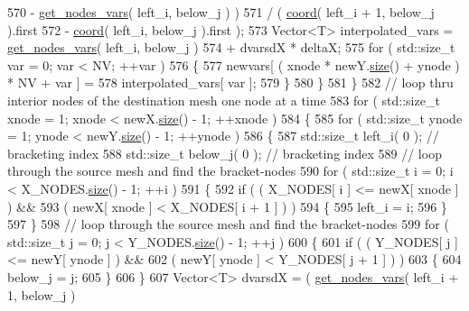 \begin{DoxyCode}
570                               - \hyperlink{classLuna_1_1Mesh2D_ae91c7515960ecedf43e4ed3f411080a1}{get\_nodes\_vars}( left\_i, below\_j ) )
571                            / ( \hyperlink{classLuna_1_1Mesh2D_add4d12155922731ccf59fe4454699eed}{coord}( left\_i + 1, below\_j ).first
572                               - \hyperlink{classLuna_1_1Mesh2D_add4d12155922731ccf59fe4454699eed}{coord}( left\_i, below\_j ).first );
573         Vector<T> interpolated\_vars =   \hyperlink{classLuna_1_1Mesh2D_ae91c7515960ecedf43e4ed3f411080a1}{get\_nodes\_vars}( left\_i, below\_j )
574                                       + dvarsdX * deltaX;
575         \textcolor{keywordflow}{for} ( std::size\_t var = 0; var < NV; ++var )
576         \{
577           newvars[ ( xnode * newY.\hyperlink{classLuna_1_1Vector_ac9b6ed7a0df401728f27c193fbc8f4d8}{size}() + ynode ) * NV + var ] =
578                                                        interpolated\_vars[ var ];
579         \}
580       \}
581     \}
582     \textcolor{comment}{// loop thru interior nodes of the destination mesh one node at a time}
583     \textcolor{keywordflow}{for} ( std::size\_t xnode = 1; xnode < newX.\hyperlink{classLuna_1_1Vector_ac9b6ed7a0df401728f27c193fbc8f4d8}{size}() - 1; ++xnode )
584     \{
585       \textcolor{keywordflow}{for} ( std::size\_t ynode = 1; ynode < newY.\hyperlink{classLuna_1_1Vector_ac9b6ed7a0df401728f27c193fbc8f4d8}{size}() - 1; ++ynode )
586       \{
587         std::size\_t left\_i( 0 );  \textcolor{comment}{// bracketing index}
588         std::size\_t below\_j( 0 ); \textcolor{comment}{// bracketing index}
589         \textcolor{comment}{// loop through the source mesh and find the bracket-nodes}
590         \textcolor{keywordflow}{for} ( std::size\_t i = 0; i < X\_NODES.\hyperlink{classLuna_1_1Vector_ac9b6ed7a0df401728f27c193fbc8f4d8}{size}() - 1; ++i )
591         \{
592           \textcolor{keywordflow}{if} ( ( X\_NODES[ i ] <= newX[ xnode ] ) &&
593                ( newX[ xnode ] < X\_NODES[ i + 1 ] ) )
594           \{
595             left\_i = i;
596           \}
597         \}
598         \textcolor{comment}{// loop through the source mesh and find the bracket-nodes}
599         \textcolor{keywordflow}{for} ( std::size\_t j = 0; j < Y\_NODES.\hyperlink{classLuna_1_1Vector_ac9b6ed7a0df401728f27c193fbc8f4d8}{size}() - 1; ++j )
600         \{
601           \textcolor{keywordflow}{if} ( ( Y\_NODES[ j ] <= newY[ ynode ] ) &&
602                ( newY[ ynode ] < Y\_NODES[ j + 1 ] ) )
603           \{
604             below\_j = j;
605           \}
606         \}
607         Vector<T> dvarsdX = ( \hyperlink{classLuna_1_1Mesh2D_ae91c7515960ecedf43e4ed3f411080a1}{get\_nodes\_vars}( left\_i + 1, below\_j )

\end{DoxyCode}
